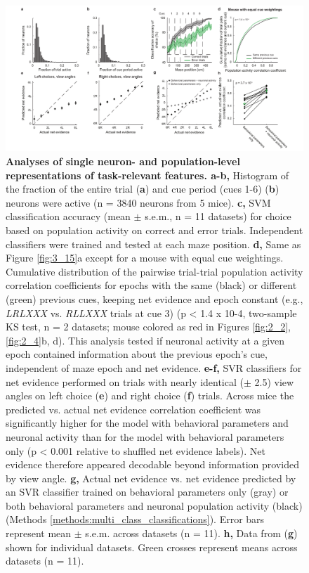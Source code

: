 \begin{figure}
\includegraphics[width=1\textwidth,center]{figures/fig_3_5.pdf}
\caption[Analyses of single neuron- and population-level representations of task-relevant features.]
{\textbf{Analyses of single neuron- and population-level representations of task-relevant features. a-b,} Histogram of the fraction of the entire trial (\textbf{a}) and cue period (cues 1-6) (\textbf{b}) neurons were active (n = 3840 neurons from 5 mice). 
%
\textbf{c,} SVM classification accuracy (mean $\pm$ s.e.m., n = 11 datasets) for choice based on population activity on correct and error trials. Independent classifiers were trained and tested at each maze position. 
%
\textbf{d,} Same as Figure \ref{fig:3_15}a except for a mouse with equal cue weightings. Cumulative distribution of the pairwise trial-trial population activity correlation coefficients for epochs with the same (black) or different (green) previous cues, keeping net evidence and epoch constant (e.g., \textit{LRLXXX} vs. \textit{RLLXXX} trials at cue 3) (p < 1.4 x 10-4, two-sample KS test, n = 2 datasets; mouse colored as red in Figures \ref{fig:2_2}, \ref{fig:2_4}b, d). This analysis tested if neuronal activity at a given epoch contained information about the previous epoch's cue, independent of maze epoch and net evidence. 
%
\textbf{e-f,} SVR classifiers for net evidence performed on trials with nearly identical ($\pm$ 2.5\textdegree) view angles on left choice (\textbf{e}) and right choice (\textbf{f}) trials. Across mice the predicted vs. actual net evidence correlation coefficient was significantly higher for the model with behavioral parameters and neuronal activity than for the model with behavioral parameters only (p < 0.001 relative to shuffled net evidence labels). Net evidence therefore appeared decodable beyond information provided by view angle.
%
\textbf{g,} Actual net evidence vs. net evidence predicted by an SVR classifier trained on behavioral parameters only (gray) or both behavioral parameters and neuronal population activity (black) (Methods \ref{methods:multi_class_classifications}). Error bars represent mean $\pm$ s.e.m. across datasets (n = 11). 
%
\textbf{h,} Data from (\textbf{g}) shown for individual datasets. Green crosses represent means across datasets (n = 11). 
\label{fig:3_5}}
\end{figure}

